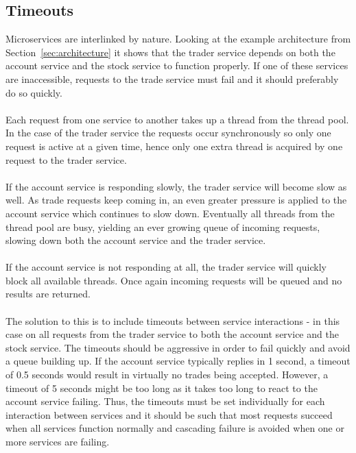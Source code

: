 \subsection{Timeouts}
Microservices are interlinked by nature. Looking at the example
architecture from Section~\ref{sec:architecture} it shows that the
trader service depends on both the account service and the stock
service to function properly. If one of these services are
inaccessible, requests to the trade service must fail and it should
preferably do so quickly.
\\\\
Each request from one service to another takes up a thread from the
thread pool. In the case of the trader service the requests occur
synchronously so only one request is active at a given time, hence
only one extra thread is acquired by one request to the trader
service.
\\\\
If the account service is responding slowly, the trader service will
become slow as well. As trade requests keep coming in, an even greater
pressure is applied to the account service which continues to slow
down. Eventually all threads from the thread pool are busy, yielding an
ever growing queue of incoming requests, slowing down both the account
service and the trader service.
\\\\
If the account service is not responding at all, the trader service
will quickly block all available threads. Once again incoming requests
will be queued and no results are returned.
\\\\
The solution to this is to include timeouts between service
interactions - in this case on all requests from the trader service to
both the account service and the stock service. The timeouts should be
aggressive in order to fail quickly and avoid a queue building up. If
the account service typically replies in 1 second, a timeout of 0.5
seconds would result in virtually no trades being accepted. However, a
timeout of 5 seconds might be too long as it takes too long to react
to the account service failing. Thus, the timeouts must be set
individually for each interaction between services and it should be
such that most requests succeed when all services function normally
and cascading failure is avoided when one or more services are
failing.
 
